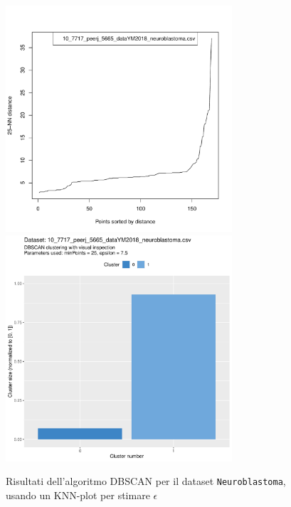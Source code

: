 \documentclass[a4paper, 12pt]{report}
\begin{document}
			\begin{figure}[H]
				\centering
				\includegraphics[width = 0.75\textwidth, height = 0.45\textheight, page = 3]{
					doc/DBSCAN_optimal_MinPts.pdf
				}
				\includegraphics[width = 0.75\textwidth, height = 0.45\textheight, page = 3]{
					results/DBSCAN_visual_comparison.pdf
				}
				\caption{Risultati dell'algoritmo DBSCAN per il dataset
				\texttt{Neuroblastoma}, usando un KNN-plot per stimare $\epsilon$}
				\label{fig:dbscan-extra3}
			\end{figure}
\end{document}
